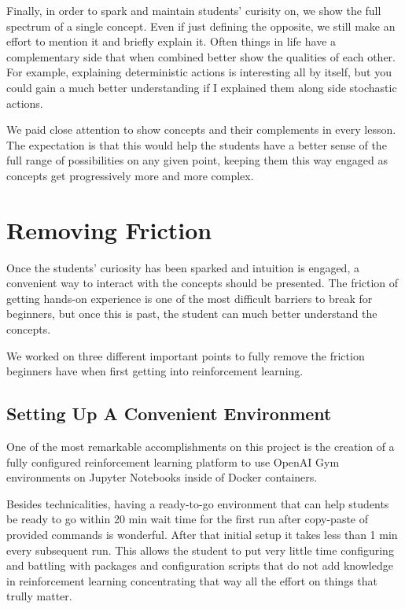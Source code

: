 \documentclass[11pt]{article} %
\begin{document}
Finally, in order to spark and maintain students' curisity on, we show the
full spectrum of a single concept. Even if just defining the opposite, we
still make an effort to mention it and briefly explain it. Often things in
life have a complementary side that when combined better show the qualities
of each other. For example, explaining deterministic actions is interesting
all by itself, but you could gain a much better understanding if I explained
them along side stochastic actions.

We paid close attention to show concepts and their complements in every
lesson. The expectation is that this would help the students have a better
sense of the full range of possibilities on any given point, keeping them
this way engaged as concepts get progressively more and more complex.

\section{Removing Friction}

Once the students' curiosity has been sparked and intuition is engaged, a
convenient way to interact with the concepts should be presented. The
friction of getting hands-on experience is one of the most difficult
barriers to break for beginners, but once this is past, the student can
much better understand the concepts.

We worked on three different important points to fully remove the friction
beginners have when first getting into reinforcement learning.

\subsection{Setting Up A Convenient Environment}

One of the most remarkable accomplishments on this project is the creation
of a fully configured reinforcement learning platform to use OpenAI
Gym \cite{openaigym} environments on Jupyter Notebooks inside of Docker
containers.

Besides technicalities, having a ready-to-go environment that can help
students be ready to go within 20 min wait time for the first run after
copy-paste of provided commands is wonderful. After that initial setup
it takes less than 1 min every subsequent run. This allows the student to put
very little time configuring and battling with packages and configuration
scripts that do not add knowledge in reinforcement learning concentrating
that way all the effort on things that trully matter.
\end{document}

